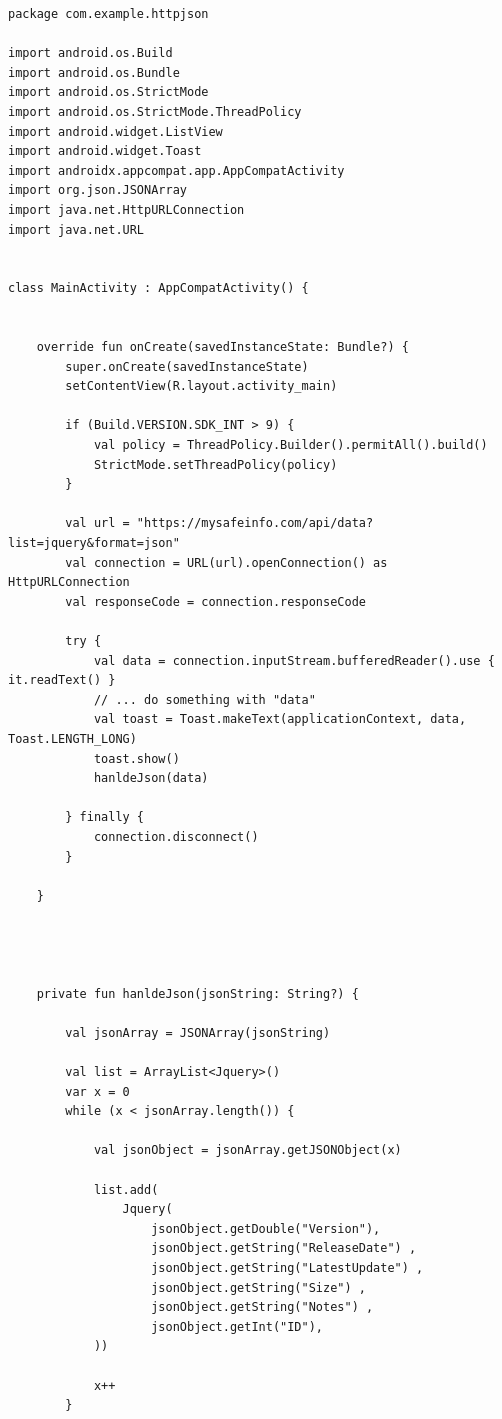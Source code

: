 \documentclass[a4paper, 14pt]{extarticle}
\begin{document}
\begin{lstlisting}[language={},caption={},label={lst:code1}]
package com.example.httpjson

import android.os.Build
import android.os.Bundle
import android.os.StrictMode
import android.os.StrictMode.ThreadPolicy
import android.widget.ListView
import android.widget.Toast
import androidx.appcompat.app.AppCompatActivity
import org.json.JSONArray
import java.net.HttpURLConnection
import java.net.URL


class MainActivity : AppCompatActivity() {


    override fun onCreate(savedInstanceState: Bundle?) {
        super.onCreate(savedInstanceState)
        setContentView(R.layout.activity_main)

        if (Build.VERSION.SDK_INT > 9) {
            val policy = ThreadPolicy.Builder().permitAll().build()
            StrictMode.setThreadPolicy(policy)
        }

        val url = "https://mysafeinfo.com/api/data?list=jquery&format=json"
        val connection = URL(url).openConnection() as HttpURLConnection
        val responseCode = connection.responseCode

        try {
            val data = connection.inputStream.bufferedReader().use { it.readText() }
            // ... do something with "data"
            val toast = Toast.makeText(applicationContext, data, Toast.LENGTH_LONG)
            toast.show()
            hanldeJson(data)

        } finally {
            connection.disconnect()
        }

    }




    private fun hanldeJson(jsonString: String?) {

        val jsonArray = JSONArray(jsonString)

        val list = ArrayList<Jquery>()
        var x = 0
        while (x < jsonArray.length()) {

            val jsonObject = jsonArray.getJSONObject(x)

            list.add(
                Jquery(
                    jsonObject.getDouble("Version"),
                    jsonObject.getString("ReleaseDate") ,
                    jsonObject.getString("LatestUpdate") ,
                    jsonObject.getString("Size") ,
                    jsonObject.getString("Notes") ,
                    jsonObject.getInt("ID"),
            ))

            x++
        }


\end{lstlisting}
\end{document}
